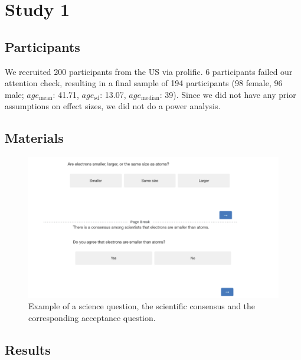 \documentclass[
  doc,floatsintext]{apa6}
\begin{document}
\clearpage

\section{Study 1}\label{exp1}

\subsection{Participants}\label{participants-1}

We recruited 200 participants from the US via prolific. 6 participants failed our attention check, resulting in a final sample of 194 participants (98 female, 96 male; \(age_\text{mean}\): 41.71, \(age_\text{sd}\): 13.07, \(age_\text{median}\): 39). Since we did not have any prior assumptions on effect sizes, we did not do a power analysis.

\subsection{Materials}\label{materials-2}

\FloatBarrier



\begin{figure}

\includegraphics[width=1\linewidth]{./figures/study1_question_example} \hfill{}

\caption{Example of a science question, the scientific consensus and the corresponding acceptance question.}\label{fig:stimulus-example}
\end{figure}

\subsection{Results}\label{results-1}
\end{document}
